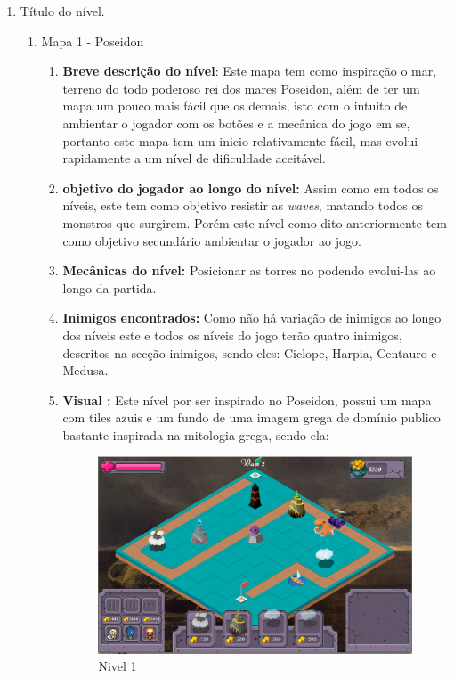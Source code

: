 \documentclass[11pt]{article} %
\begin{document}
\begin{enumerate}
\item Título do nível.
	\begin{enumerate}
	\item Mapa 1 - Poseidon
		\begin{enumerate}
		\item \textbf{Breve descrição do nível}: Este mapa tem como inspiração o mar, terreno do todo poderoso rei dos mares Poseidon, além de ter um mapa um pouco mais fácil que os demais, isto com o intuito de ambientar o jogador com os botões e a mecânica do jogo em se, portanto este mapa tem um inicio relativamente fácil, mas evolui rapidamente a um nível de dificuldade aceitável.
		\item \textbf{objetivo do jogador ao longo do nível:} Assim como em todos os níveis, este tem como objetivo resistir as \textit{waves}, matando todos os monstros que surgirem. Porém este nível como dito anteriormente tem como objetivo secundário ambientar o jogador ao jogo.
		\item \textbf{Mecânicas do nível:} Posicionar as torres no podendo evolui-las ao longo da partida.
		\item \textbf{Inimigos encontrados:} Como não há variação de inimigos ao longo dos níveis este e todos os níveis do jogo terão quatro inimigos, descritos na secção inimigos, sendo eles: Ciclope, Harpia, Centauro e Medusa.
		\item \textbf{Visual :} Este nível por ser inspirado no Poseidon, possui um mapa com tiles azuis e um fundo de uma imagem grega de domínio publico bastante inspirada na mitologia grega, sendo ela:
		
			\begin{figure}[!htp]
			\centering
			\includegraphics[scale=0.3]{res/nivel1.png}
			\caption{Nivel 1}
			\label{nivel1}
			\end{figure}
			

\end{enumerate}
\end{enumerate}
\end{enumerate}
\end{document}
